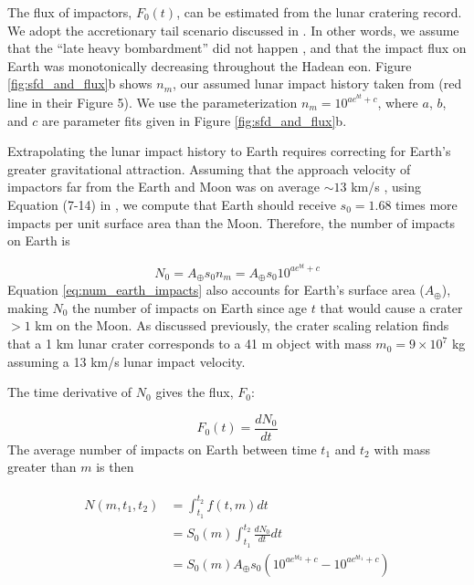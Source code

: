 \documentclass{Liebert_Author}
\begin{document}
The flux of impactors, $F_0(t)$, can be estimated from the lunar cratering record. We adopt the accretionary tail scenario discussed in \citet{Morbidelli_2018}. In other words, we assume that the ``late heavy bombardment'' did not happen \citep{Cartwright_2022,Hartmann_2019,Zellner_2017}, and that the impact flux on Earth was monotonically decreasing throughout the Hadean eon. Figure \ref{fig:sfd_and_flux}b shows $n_m$, our assumed lunar impact history taken from \citet{Morbidelli_2018} (red line in their Figure 5). We use the parameterization $n_m = 10^{a e^{b t} + c}$, where $a$, $b$, and $c$ are parameter fits given in Figure \ref{fig:sfd_and_flux}b.

Extrapolating the lunar impact history to Earth requires correcting for Earth's greater gravitational attraction. Assuming that the approach velocity of impactors far from the Earth and Moon was on average $\sim 13$ km/s \citep{Marchi_2018}, using Equation (7-14) in \citet{Zahnle_2006}, we compute that Earth should receive $s_0 = 1.68$ times more impacts per unit surface area than the Moon. Therefore, the number of impacts on Earth is

\begin{equation}
  N_0 = A_\oplus s_0 n_m = A_\oplus s_0 10^{a e^{b t} + c}
  \label{eq:num_earth_impacts}
\end{equation}
Equation \eqref{eq:num_earth_impacts} also accounts for Earth's surface area ($A_\oplus$), making $N_0$ the number of impacts on Earth since age $t$ that would cause a crater $> 1$ km on the Moon. As discussed previously, the \citet{Johnson_2016} crater scaling relation finds that a 1 km lunar crater corresponds to a 41 m object with mass $m_0 = 9 \times 10^{7}$ kg assuming a 13 km/s lunar impact velocity.

The time derivative of $N_0$ gives the flux, $F_0$:

\begin{equation}
  F_0(t) = \frac{d N_0}{dt}
\end{equation}
The average number of impacts on Earth between time $t_1$ and $t_2$ with mass greater than $m$ is then

\begin{align}
\begin{split}
  N(m,t_1,t_2) &= \int_{t_1}^{t_2} f(t,m) dt \\
  &= S_0(m) \int_{t_1}^{t_2} \frac{d N_0}{dt} dt \\
  &= S_0(m) A_\oplus s_0 \left( 10^{a e^{b t_2} + c} - 10^{a e^{b t_1} + c} \right)
\end{split}
\end{align}
\end{document}
